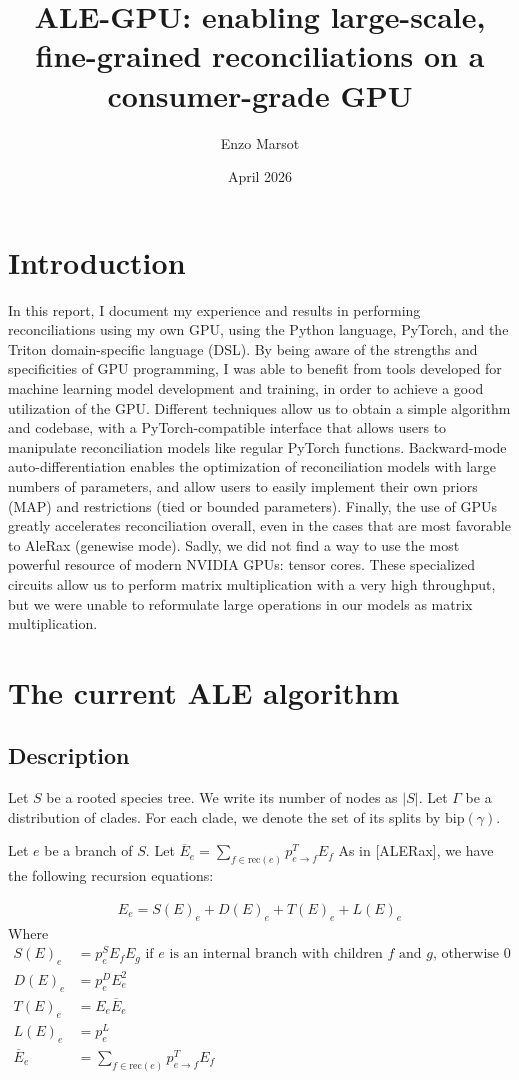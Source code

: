 \documentclass{article}
\title{ALE-GPU: enabling large-scale, fine-grained reconciliations on a consumer-grade GPU}
\author{Enzo Marsot}
\date{April 2026}
\newcommand{\1}{\mathbf{1}}
\newcommand{\bip}{\mathrm{bip}}
\newcommand{\Ebar}{\overline{E}}
\newcommand{\rec}{\mathrm{rec}}
\begin{document}
\maketitle

\section{Introduction}
In this report, I document my experience and results in performing reconciliations using my own GPU, using the Python language, PyTorch, and the Triton domain-specific language (DSL).
By being aware of the strengths and specificities of GPU programming, I was able to benefit from tools developed for machine learning model development and training, in order to achieve a good utilization of the GPU. Different techniques allow us to obtain a simple algorithm and codebase, with a PyTorch-compatible interface that allows users to manipulate reconciliation models like regular PyTorch functions. Backward-mode auto-differentiation enables the optimization of reconciliation models with large numbers of parameters, and allow users to easily implement their own priors (MAP) and restrictions (tied or bounded parameters). Finally, the use of GPUs greatly accelerates reconciliation overall, even in the cases that are most favorable to AleRax (genewise mode). Sadly, we did not find a way to use the most powerful resource of modern NVIDIA GPUs: tensor cores. These specialized circuits allow us to perform matrix multiplication with a very high throughput, but we were unable to reformulate large operations in our models as matrix multiplication.

\section{The current ALE algorithm}
\subsection{Description}
Let $S$ be a rooted species tree. We write its number of nodes as $|S|$. Let $\Gamma$ be a distribution of clades. For each clade, we denote the set of its splits by $\bip(\gamma)$.

Let $e$ be a branch of $S$.
Let $\Ebar_e = \sum_{f\in \rec(e)}{p^T_{e\to f}E_f}$
As in [ALERax], we have the following recursion equations:

\begin{align*}
    E_{e} = S(E)_e + D(E)_e + T(E)_e + L(E)_e
\end{align*}
Where 
\begin{align*}
    S(E)_e &= p^S_e E_f E_g \text{ if } e \text{ is an internal branch with children } f \text{ and } g \text {, otherwise } 0\\
    D(E)_e &= p^D_e E_e^2\\
    T(E)_e &= E_e \Ebar_e\\
    L(E)_e &= p^L_e\\
    \Ebar_e &= \sum_{f\in \rec(e)}{p^T_{e\to f}E_f}
\end{align*}
\end{document}
